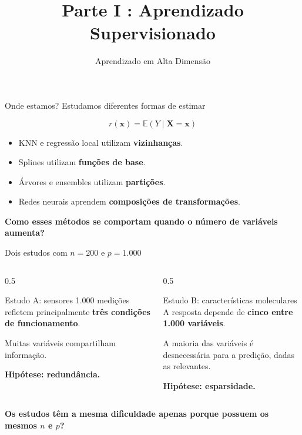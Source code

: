 \documentclass[
  10pt,
  ignorenonframetext,
  aspectratio=169,
  brazilian,
]{beamer}
\title{\texorpdfstring{Parte I : Aprendizado
Supervisionado}{Parte I : Aprendizado Supervisionado}}
\subtitle{\texorpdfstring{{Aprendizado em Alta
Dimensão}}{Aprendizado em Alta Dimensão}}
\author{}
\date{}
\providecommand{\tightlist}{%
  \setlength{\itemsep}{0pt}\setlength{\parskip}{0pt}}
\begin{document}
\frame{\titlepage}


\begin{frame}{Onde estamos?}
\protect{}\label{onde-estamos}
Estudamos diferentes formas de estimar

\[
r(\mathbf x)=\mathbb E(Y\mid\mathbf X=\mathbf x)
\]

\begin{itemize}
\tightlist
\item
  KNN e regressão local utilizam \textbf{vizinhanças}.
\item
  Splines utilizam \textbf{funções de base}.
\item
  Árvores e ensembles utilizam \textbf{partições}.
\item
  Redes neurais aprendem \textbf{composições de transformações}.
\end{itemize}

\textbf{Como esses métodos se comportam quando o número de variáveis
aumenta?}

\end{frame}

\begin{frame}{Dois estudos com \(n=200\) e \(p=1.000\)}
\protect{}\label{dois-estudos-com-n200-e-p1.000}
\begin{columns}[T]
\begin{column}{0.5\linewidth}
\begin{block}{Estudo A: sensores}
\protect{}\label{estudo-a-sensores}
1.000 medições refletem principalmente \textbf{três condições de
funcionamento}.

Muitas variáveis compartilham informação.

\textbf{Hipótese: redundância.}
\end{block}
\end{column}

\begin{column}{0.5\linewidth}
\begin{block}{Estudo B: características moleculares}
\protect{}\label{estudo-b-caracteruxedsticas-moleculares}
A resposta depende de \textbf{cinco entre 1.000 variáveis}.

A maioria das variáveis é desnecessária para a predição, dadas as
relevantes.

\textbf{Hipótese: esparsidade.}
\end{block}
\end{column}
\end{columns}

\textbf{Os estudos têm a mesma dificuldade apenas porque possuem os
mesmos \(n\) e \(p\)?}
\end{frame}
\end{document}
